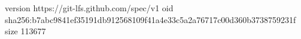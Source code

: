 version https://git-lfs.github.com/spec/v1
oid sha256:b7abc9841ef35191db912568109f41a4e33c5a2a76717c00d360b3738759231f
size 113677
